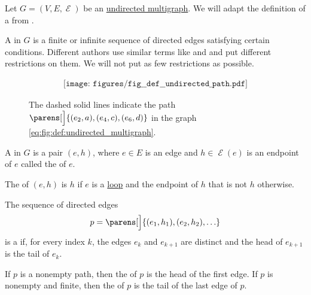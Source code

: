 \begin{definition}\label{def:undirected_multigraph_path}
  Let \( G = (V, E, \mscrE) \) be an \hyperref[def:undirected_multigraph]{undirected multigraph}. We will adapt the definition of a  from .

  A  in \( G \) is a finite or infinite sequence of directed edges satisfying certain conditions. Different authors use similar terms like  and  and put different restrictions on them. We will not put as few restrictions as possible.

  \begin{figure}
    \begin{equation}\label{eq:fig:def:undirected_path}
      \begin{aligned}
        \texttt{[image: figures/fig\_\_def\_\_undirected\_path.pdf]}
      \end{aligned}
    \end{equation}
    \caption{The dashed solid lines indicate the path \( \parens[\Big]{ (e_2, a), (e_4, c), (e_6, d) } \) in the graph \eqref{eq:fig:def:undirected_multigraph}.}\label{fig:def:undirected_path}
  \end{figure}

  \begin{thmenum}
     A  in \( G \) is a pair \( (e, h) \), where \( e \in E \) is an edge and \( h \in \mscrE(e) \) is an endpoint of \( e \) called the  of \( e \).

    The  of \( (e, h) \) is \( h \) if \( e \) is a \hyperref[def:hypergraph/cardinality]{loop} and the endpoint of \( h \) that is not \( h \) otherwise.

     The sequence of directed edges
    \begin{equation}\label{eq:def:undirected_multigraph_path/path}
      p = \parens[\Big]{ (e_1, h_1), (e_2, h_2), \ldots }
    \end{equation}
    is a  if, for every index \( k \), the edges \( e_k \) and \( e_{k+1} \) are distinct and the head of \( e_{k+1} \) is the tail of \( e_k \).

     If \( p \) is a nonempty path, then the  of \( p \) is the head of the first edge. If \( p \) is nonempty and finite, then the  of \( p \) is the tail of the last edge of \( p \).


\end{thmenum}
\end{definition}
